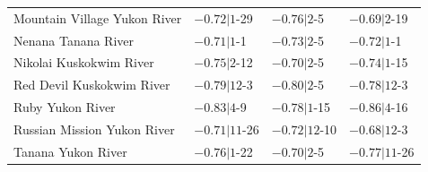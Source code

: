 \documentclass[12pts,draft]{AR_analysis_}
\begin{document}
\begin{table}[h]
\begin{tabular}{llll}
	Mountain Village Yukon River  &  $-0.72|1$-29 &   $-0.76|2$-5 &    $-0.69|2$-19 \\
	Nenana Tanana River           &  $-0.71|1$-1 &    $-0.73|2$-5 &    $-0.72|1$-1 \\
	Nikolai Kuskokwim River       &  $-0.75|2$-12 &   $-0.70|2$-5 &    $-0.74|1$-15 \\
	Red Devil Kuskokwim River     &  $-0.79|12$-3 &   $-0.80|2$-5 &    $-0.78|12$-3 \\
	Ruby Yukon River              &  $-0.83|4$-9 &    $-0.78|1$-15 &   $-0.86|4$-16 \\
	Russian Mission Yukon River   &  $-0.71|11$-26 &  $-0.72|12$-10 &  $-0.68|12$-3 \\
	Tanana Yukon River            &  $-0.76|1$-22 &   $-0.70|2$-5 &    $-0.77|11$-26 \\
    \bottomrule
    \end{tabular}
\end{table}
\end{document}
